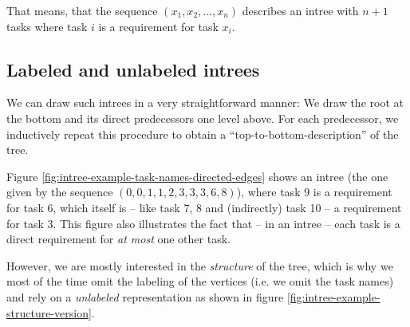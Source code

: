 That means, that the sequence $(x_1,x_2,\dots,x_n)$ describes an intree with $n+1$ tasks where task $i$ is a requirement for task $x_i$.

\subsection{Labeled and unlabeled intrees}
\label{sec:intrees-labelled-unlabelled}

We can draw such intrees in a very straightforward manner: We draw the root at the bottom and its direct predecessors one level above. For each predecessor, we inductively repeat this procedure to obtain a ``top-to-bottom-description'' of the tree.

Figure \ref{fig:intree-example-task-names-directed-edges} shows an intree (the one given by the sequence $(0,0,1,1,2,3,3,3,6,8)$), where task 9 is a requirement for task 6, which itself is -- like task 7, 8 and (indirectly) task 10 -- a requirement for task 3. This figure also illustrates the fact that -- in an intree -- each task is a direct requirement for \emph{at most} one other task.

However, we are mostly interested in the \emph{structure} of the tree, which is why we most of the time omit the labeling of the vertices (i.e. we omit the task names) and rely on a \emph{unlabeled} representation as shown in figure \ref{fig:intree-example-structure-version}. 

